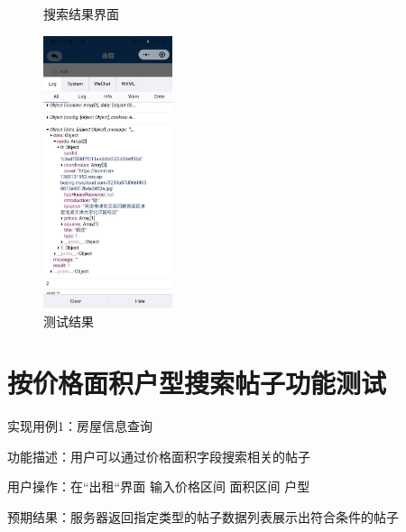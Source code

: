 \begin{figure}[htbp]
\begin{minipage}[t]{0.32\textwidth}
   \caption{搜索结果界面} 
    \end{minipage}
    \begin{minipage}[t]{0.32\textwidth}
    \centering
    \includegraphics[width=3.8cm,height=8cm]{test/image/test21.png}
    \caption{测试结果}
    \end{minipage}
    \end{figure}

\section{按价格面积户型搜索帖子功能测试}
实现用例1：房屋信息查询

功能描述：用户可以通过价格面积字段搜索相关的帖子

用户操作：在“出租“界面 输入价格区间 面积区间 户型

预期结果：服务器返回指定类型的帖子数据列表展示出符合条件的帖子

